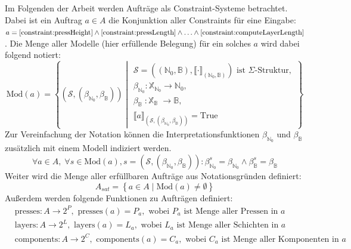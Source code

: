 Im Folgenden der Arbeit werden Aufträge als Constraint-Systeme betrachtet.
Dabei ist ein Auftrag $a \in A$ die Konjunktion aller Constraints für eine Eingabe:
$a = \ref{constraint:pressHeight} \land \ref{constraint:pressLength} \land \ldots \land \ref{constraint:computeLayerLength}$.
Die Menge aller Modelle (hier erfüllende Belegung) für ein solches $a$ wird dabei folgend notiert:
\[
    \text{Mod}(a) = \left\{
        (\mathcal{S}, (\beta_{\mathbb{N}_0}, \beta_{\mathbb{B}})) \middle|
            \begin{array}{l}
                \mathcal{S} = ((\mathbb{N}_0, \mathbb{B}), \llbracket \cdot \rrbracket_{(\mathbb{N}_0, \mathbb{B})}) \text{ ist } \Sigma\text{-Struktur}, \\
                \beta_{\mathbb{N}_0}: \mathbb{X}_{\mathbb{N}_0} \rightarrow \mathbb{N}_0, \\
                \beta_{\mathbb{B}_{\phantom{0}}}: \mathbb{X}_{\mathbb{B}_{\phantom{0}}} \rightarrow \mathbb{B}, \\
                \llbracket a \rrbracket_{(\mathcal{S}, (\beta_{\mathbb{N}_0}, \beta_{\mathbb{B}}))} = \text{True}
            \end{array}
    \right\}
\]
Zur Vereinfachung der Notation können die Interpretationsfunktionen $\beta_{\mathbb{N}_0}$ und $\beta_{\mathbb{B}}$ zusätzlich mit einem Modell indiziert werden.
\[
    \forall a \in A, \; \forall s \in \text{Mod}(a), s = (\mathcal{S}, (\beta_{\mathbb{N}_0}, \beta_{\mathbb{B}})): \beta_{\mathbb{N}_0}^s = \beta_{\mathbb{N}_0} \land \beta_{\mathbb{B}}^s = \beta_{\mathbb{B}}
\]
Weiter wird die Menge aller erfüllbaren Aufträge aus Notationsgründen definiert:
\[
    A_{sat} = \left\{ a \in A \mid \text{Mod}(a) \neq \emptyset \right\}
\]
Außerdem werden folgende Funktionen zu Aufträgen definiert:
\begin{align*}
    & \text{presses}: A \rightarrow 2^P, \text{ presses}(a) = P_a, \text{ wobei } P_a \text{ ist Menge aller Pressen in } a \\
    & \text{layers}: A \rightarrow 2^L, \text{ layers}(a) = L_a, \text{ wobei } L_a \text{ ist Menge aller Schichten in } a \\
    & \text{components}: A \rightarrow 2^C, \text{ components}(a) = C_a, \text{ wobei } C_a \text{ ist Menge aller Komponenten in } a \\
\end{align*}

